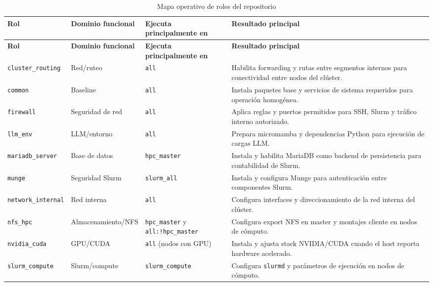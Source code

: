{\small
\begin{longtable}{|>{\raggedright\arraybackslash}p{2.4cm}|>{\raggedright\arraybackslash}p{3.1cm}|>{\raggedright\arraybackslash}p{3.5cm}|>{\raggedright\arraybackslash}p{5.1cm}|}
\caption{Mapa operativo de roles del repositorio\label{tab:roles_mapa_operativo}}\\
\hline
\textbf{Rol} & \textbf{Dominio funcional} & \textbf{Ejecuta principalmente en} & \textbf{Resultado principal} \\
\hline
\endfirsthead
\hline
\textbf{Rol} & \textbf{Dominio funcional} & \textbf{Ejecuta principalmente en} & \textbf{Resultado principal} \\
\hline
\endhead
\hline
\endfoot
\hline
\endlastfoot
\texttt{cluster\_routing} & Red\slash ruteo & \texttt{all} & Habilita forwarding y rutas entre segmentos internos para conectividad entre nodos del clúster. \\
\hline
\texttt{common} & Baseline & \texttt{all} & Instala paquetes base y servicios de sistema requeridos para operación homogénea. \\
\hline
\texttt{firewall} & Seguridad de red & \texttt{all} & Aplica reglas y puertos permitidos para SSH, Slurm y tráfico interno autorizado. \\
\hline
\texttt{llm\_env} & LLM\slash entorno & \texttt{all} & Prepara micromamba y dependencias Python para ejecución de cargas LLM. \\
\hline
\texttt{mariadb\_server} & Base de datos & \texttt{hpc\_master} & Instala y habilita MariaDB como backend de persistencia para contabilidad de Slurm. \\
\hline
\texttt{munge} & Seguridad Slurm & \texttt{slurm\_all} & Instala y configura Munge para autenticación entre componentes Slurm. \\
\hline
\texttt{network\_internal} & Red interna & \texttt{all} & Configura interfaces y direccionamiento de la red interna del clúster. \\
\hline
\texttt{nfs\_hpc} & Almacenamiento\slash NFS & \texttt{hpc\_master} y \texttt{all:!hpc\_master} & Configura export NFS en master y montajes cliente en nodos de cómputo. \\
\hline
\texttt{nvidia\_cuda} & GPU\slash CUDA & \texttt{all} (nodos con GPU) & Instala y ajusta stack NVIDIA/CUDA cuando el host reporta hardware acelerado. \\
\hline
\texttt{slurm\_compute} & Slurm\slash compute & \texttt{slurm\_compute} & Configura \texttt{slurmd} y parámetros de ejecución en nodos de cómputo. \\

\end{longtable}}
